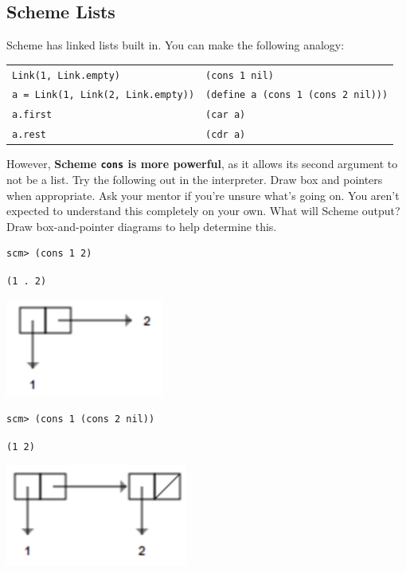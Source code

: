 \documentclass{exam}
\begin{document}
\begin{questions}
\section{Scheme Lists}
\begin{blocksection}
Scheme has linked lists built in. You can make the following analogy:
\begin{center}
\begin{tabular}{ |l|l| }
\hline
 \texttt{Link(1, Link.empty)} & \texttt{(cons 1 nil)} \\
 \texttt{a = Link(1, Link(2, Link.empty))} & \texttt{(define a (cons 1 (cons 2 nil)))}  \\
 \texttt{a.first} & \texttt{(car a)} \\
 \texttt{a.rest} & \texttt{(cdr a)} \\
 \hline
\end{tabular}
\end{center}
However, \textbf{Scheme \texttt{cons} is more powerful}, as it allows its second argument to not be a list. Try the following out in the interpreter. Draw box and pointers when appropriate. Ask your mentor if you're unsure what's going on. You aren't expected to understand this completely on your own.
\question What will Scheme output? Draw box-and-pointer diagrams to help determine this.

\begin{lstlisting}
scm> (cons 1 2)
\end{lstlisting}
\begin{solution}[0.5in]
\texttt{(1 . 2)}
\begin{center}
\includegraphics[scale=1]{9a}
\end{center}
\end{solution}

\begin{lstlisting}
scm> (cons 1 (cons 2 nil))
\end{lstlisting}
\begin{solution}[0.5in]
\texttt{(1 2)}
\begin{center}
\includegraphics[scale=1]{9b}
\end{center}
\end{solution}


\end{blocksection}
\end{questions}
\end{document}
